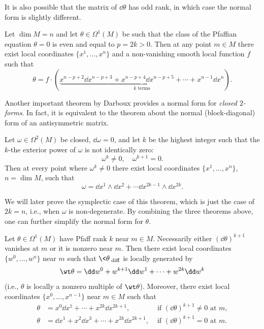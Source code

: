It is also possible that the matrix of $\dd\theta$ has odd rank, in which case the normal form is slightly different.

\begin{thm}\label{thm pfaff normal form}
    Let $\dim M=n$ and let $\theta\in\Omega^1(M)$ be such that the class of the Pfaffian equation $\theta=0$ is even and equal to $p=2k>0$. Then at any point $m\in M$ there exist local coordinates $\{x^1,\ldots,x^n\}$ and a non-vanishing smooth local function $f$ such that 
    \[\theta=f\cdot (\underbrace{x^{n-p+2}\dd x^{n-p+3}+x^{n-p+4}\dd x^{n-p+5}+\cdots +x^{n-1}\dd x^n}_{k\text{ terms}}).\]
\end{thm}

Another important theorem by Darboux provides a normal form for \emph{closed $2$-forms}. In fact, it is equivalent to the theorem about the normal (block-diagonal) form of an antisymmetric matrix.

\begin{thm}[Darboux]
    Let $\omega\in\Omega^2(M)$ be closed, $\dd\omega=0$, and let $k$ be the highest integer such that the $k$-the exterior power of $\omega$ is not identically zero:
    \[\omega^k\neq 0,\quad \omega^{k+1}=0.\]
    Then at every point where $\omega^k\neq 0$ there exist local coordinates $\{x^1,\ldots,x^n\}$, $n=\dim M$, such that 
    \[\omega=\dd x^1\wedge \dd x^2+\cdots \dd x^{2k-1}\wedge\dd x^{2k}.\]
\end{thm}

We will later prove the symplectic case of this theorem, which is just the case of $2k=n$, i.e., when $\omega$ is non-degenerate. By combining the three theorems above, one can further simplify the normal form for $\theta$.

\begin{thm}[Darboux]\label{thm darboux normal forms}
    Let $\theta\in\Omega^1(M)$ have Pfaff rank $k$ near $m\in M$. Necessarily either $(\dd\theta)^{k+1}$ vanishes at $m$ or it is nonzero near $m$. Then there exist local coordinates $\{w^0,\ldots,w^n\}$ near $m$ such that $\<\theta\>_{\mathrm{diff}}$ is locally generated by 
    \[\wt\theta=\dd w^0+w^{k+1}\dd w^1+\cdots +w^{2k}\dd w^k\]
    (i.e., $\theta$ is locally a nonzero multiple of $\wt\theta$). Moreover, there exist local coordinates $\{x^0,\ldots,x^{n-1}\}$ near $m\in M$ such that
    \begin{align}
        \theta&= x^0 \dd x^1+\cdots +x^{2k}\dd x^{2k+1}, &\text{ if }(\dd\theta)^{k+1}\neq 0\text{ at }m,\\
        \theta&= \dd x^1+ x^2\dd x^3+\cdots +x^{2k} \dd x^{2k+1}, &\text{ if }(\dd\theta)^{k+1}=0 \text{ at }m.
    \end{align}
\end{thm}

